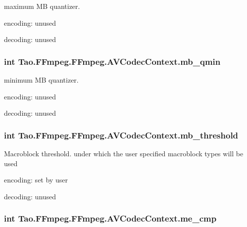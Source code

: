 \label{struct_tao_1_1_f_fmpeg_1_1_f_fmpeg_1_1_a_v_codec_context_a5c1e7dbf1459fb72b8dabf983cf4c27a}
maximum MB quantizer.
\begin{DoxyItemize}
\item encoding: unused
\item decoding: unused 
\end{DoxyItemize}\hypertarget{struct_tao_1_1_f_fmpeg_1_1_f_fmpeg_1_1_a_v_codec_context_a6aa57db811857a4197ff4cc428aae2ec}{
\subsubsection[{mb\_\-qmin}]{\setlength{\rightskip}{0pt plus 5cm}int {\bf Tao.FFmpeg.FFmpeg.AVCodecContext.mb\_\-qmin}}}
\label{struct_tao_1_1_f_fmpeg_1_1_f_fmpeg_1_1_a_v_codec_context_a6aa57db811857a4197ff4cc428aae2ec}
minimum MB quantizer.
\begin{DoxyItemize}
\item encoding: unused
\item decoding: unused 
\end{DoxyItemize}\hypertarget{struct_tao_1_1_f_fmpeg_1_1_f_fmpeg_1_1_a_v_codec_context_a100ef2571ff67ad51643a2c1a68d080a}{
\subsubsection[{mb\_\-threshold}]{\setlength{\rightskip}{0pt plus 5cm}int {\bf Tao.FFmpeg.FFmpeg.AVCodecContext.mb\_\-threshold}}}
\label{struct_tao_1_1_f_fmpeg_1_1_f_fmpeg_1_1_a_v_codec_context_a100ef2571ff67ad51643a2c1a68d080a}
Macroblock threshold. under which the user specified macroblock types will be used
\begin{DoxyItemize}
\item encoding: set by user
\item decoding: unused 
\end{DoxyItemize}\hypertarget{struct_tao_1_1_f_fmpeg_1_1_f_fmpeg_1_1_a_v_codec_context_ad36b794e852703767cd3faf5284788d5}{
\subsubsection[{me\_\-cmp}]{\setlength{\rightskip}{0pt plus 5cm}int {\bf Tao.FFmpeg.FFmpeg.AVCodecContext.me\_\-cmp}}}
